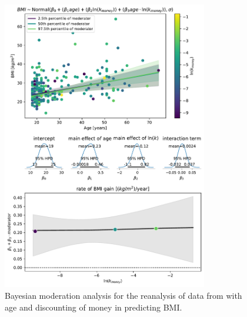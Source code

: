 \documentclass[12pt, a4paper]{article}
\begin{document}
\begin{figure} 
	\centering
	\includegraphics[width=0.8\textwidth]{veillard_vincent_2020_reanalysis/veillard_vincent_reanalysis_money.pdf} 
	\caption{Bayesian moderation analysis for the reanalysis of data from \cite{VeillardVincent2020} with age and discounting of money in predicting BMI.}
	\label{fig:vv_money}
\end{figure}
\end{document}

